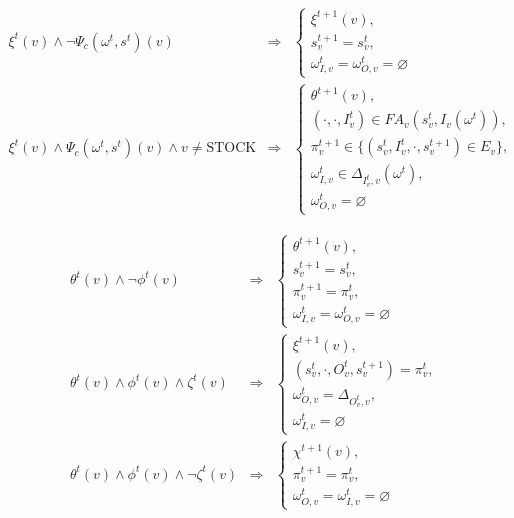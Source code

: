 \documentclass[10pt,a4paper]{article}
\newcommand{\stock}{\text{STOCK}}
\newcommand{\FA}{F\!A}
\begin{document}
\begin{eqnarray}
  \xi^t(v) \wedge \neg \Psi_c(\omega^t, s^t)(v) & \Rightarrow &
    \begin{cases}
      \xi^{t + 1}(v), \\
      s^{t + 1}_v = s^t_v, \\
      \omega^t_{I, v} = \omega^t_{O, v} = \varnothing
    \end{cases} \label{freetofree} \\
  \xi^t(v) \wedge \Psi_c(\omega^t, s^t)(v) \wedge v \neq \stock & \Rightarrow &
    \begin{cases}
      \theta^{t + 1}(v), \\
      (\cdot, \cdot, I^t_v) \in \FA_v(s^{t}_v, I_v(\omega^t)), \\
      \pi^{t + 1}_v \in \{ (s^t_v, I^t_v, \cdot, s^{t + 1}_v) \in E_v\}, \\
      \omega^t_{I, v} \in \Delta_{I^t_v, v}(\omega^t), \\
      \omega^t_{O, v} = \varnothing
    \end{cases} \label{freetostart}
\end{eqnarray}

\begin{eqnarray}
  \theta^t(v) \wedge \neg \phi^t(v) & \Rightarrow &
   \begin{cases}
     \theta^{t + 1}(v), \\
     s^{t + 1}_v = s^t_v, \\
     \pi^{t + 1}_v = \pi^t_v, \\
     \omega^t_{I, v} = \omega^t_{O, v} = \varnothing
   \end{cases} \label{worktowork} \\
  \theta^t(v) \wedge \phi^t(v) \wedge \zeta^t(v) & \Rightarrow &
    \begin{cases}
      \xi^{t + 1}(v), \\
      (s^t_v, \cdot, O^t_v, s^{t + 1}_v) = \pi^t_v, \\
      \omega^t_{O, v} = \Delta_{O^t_v, v}, \\
      \omega^t_{I, v} = \varnothing
    \end{cases} \label{worktofree}\\
  \theta^t(v) \wedge \phi^t(v) \wedge \neg \zeta^t(v) & \Rightarrow &
    \begin{cases}
      \chi^{t + 1}(v),\\
      \pi^{t + 1}_v = \pi^t_v, \\
      \omega^t_{O, v} = \omega^t_{I, v} = \varnothing
    \end{cases} \label{worktoblock}
\end{eqnarray}
\end{document}
